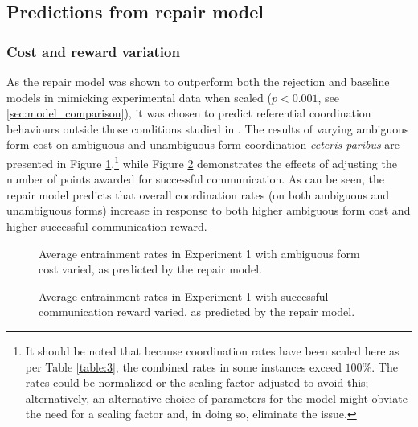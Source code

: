 \documentclass[12pt,a4paper]{article}
\begin{document}
\subsection{Predictions from repair model}
\subsubsection{Cost and reward variation}
As the repair model was shown to outperform both the rejection and baseline models in mimicking experimental data when scaled ($p<0.001$, see \ref{sec:model_comparison}), it was chosen to predict referential coordination behaviours outside those conditions studied in \citeauthor{rohde2012}. The results of varying ambiguous form cost on ambiguous and unambiguous form coordination \textit{ceteris paribus} are presented in Figure \ref{fig:3},\footnote{It should be noted that because coordination rates have been scaled here as per Table \ref{table:3}, the combined rates in some instances exceed $100\%$. The rates could be normalized or the scaling factor adjusted to avoid this; alternatively, an alternative choice of parameters for the model might obviate the need for a scaling factor and, in doing so, eliminate the issue.} while Figure \ref{fig:4} demonstrates the effects of adjusting the number of points awarded for successful communication. As can be seen, the repair model predicts that overall coordination rates (on both ambiguous and unambiguous forms) increase in response to both higher ambiguous form cost and higher successful communication reward.

\begin{figure}
\centering
\scalebox{.65}{}
\caption{Average entrainment rates in Experiment 1 with ambiguous form cost varied, as predicted by the repair model.}
\label{fig:3}
\end{figure}

\begin{figure}
\centering
\scalebox{.65}{}
\caption{Average entrainment rates in Experiment 1 with successful communication reward varied, as predicted by the repair model.}
\label{fig:4}
\end{figure}
\end{document}
